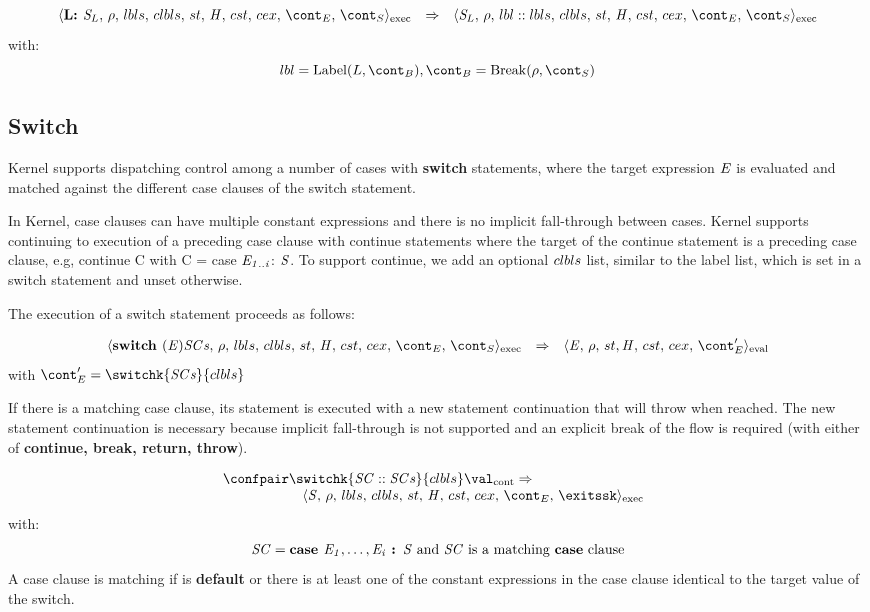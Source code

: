 \documentclass{article}
\begin{document}
\[
  \begin{array}{lcl}
	\execconf{\textbf{L: }\stmt_{L}}{\env}{\lbls}{\clbls}{\handler}{\cstrace}{\cex}{\econt}{\scont}
	& \Rightarrow &
	\execconf{\stmt_{L}}{\env}{\lbl :: \lbls}{\clbls}{\handler}{\cstrace}{\cex}{\econt}{\scont}
  \end{array}
\]
with:
\[\lbl = \mathrm{Label}(L, \bcont), \bcont = \mathrm{Break}(\env, \scont)\]
\subsection{Switch}
Kernel supports dispatching control among a number of cases with \textbf{switch} statements, where the target expression $\mathit{E}$ is evaluated and matched against the different case clauses of the switch statement. 
 
In Kernel, case clauses can have multiple constant expressions and there is no implicit fall-through between cases. Kernel supports continuing to execution of a preceding case clause with continue statements where the target of the continue statement is a preceding case clause, e.g, continue C with C = case $\mathit{E}_\mathit{1..i}$: $\mathit{S}$. To support continue, we add an optional $clbls$ list, similar to the label list, which is set in a switch statement and unset otherwise.

The execution of a switch statement proceeds as follows: 

\[
  \begin{array}{lcl}
	\execconf{\textbf{switch }(\expr) \scases }{\env}{\lbls}{\clbls}{\handler}{\cstrace}{\cex}{\econt}{\scont}
	& \Rightarrow &
	\evalconf{\expr}{\env}{\strace}{\cstrace}{\cex}{\econt'}\\
  \end{array}
\]
with $\econt' = \switchk{\scases}{\clbls}$

If there is a matching case clause, its statement is executed with a new statement continuation that will throw when reached. The new statement continuation is necessary because implicit fall-through is not supported and an explicit break of the flow is required (with either of \textbf{continue, break, return, throw}).

\[
  \begin{array}{lcl}
	\contconf{\switchk{\scase :: \scases}{\clbls}}{\val}
	\Rightarrow \hspace{30mm}\\
	\hspace{20mm}\execconf{\stmt}{\env}{\lbls}{\clbls}{\handler}{\cstrace}{\cex}{\econt}{\exitssk}
  \end{array}
\]
with:
\[
	\mathit{SC} = \textbf{case } \mathit{E}_\mathit{1}, \dots, \mathit{E}_\mathit{i} \textbf{ : } \mathit{S} \textrm{ and } \mathit{SC} \textrm{ is a matching \textbf{case} clause}
\]
A case clause is matching if is \textbf{default} or there is at least one of the constant expressions in the case clause identical to the target value of the switch.
\end{document}
